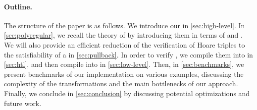 \paragraph{Outline.} The structure of the paper is as follows. We introduce our
 in \cref{sec:high-level}. In \cref{sec:polyregular},
we recall the theory of  by introducing them in terms
of  and . We will also
provide an efficient reduction of the verification of Hoare triples to the
satisfiability of a  in \cref{sec:pullback}.
In order to verify , we compile them into  in \cref{sec:htl}, and then compile  into
 in \cref{sec:low-level}. 
%
Then, in \cref{sec:benchmarks}, we present
benchmarks of our implementation on various examples, discussing
the complexity of the transformations and the main bottlenecks of our approach.
Finally, we conclude in \cref{sec:conclusion} by discussing potential
optimizations and future work.

